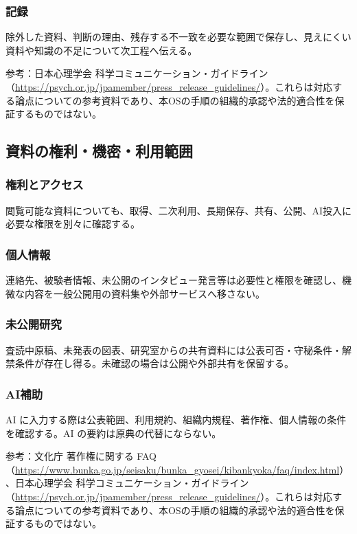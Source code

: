 \documentclass[a4paper,11pt]{article}
\begin{document}
\subsubsection{記録}
\par 除外した資料、判断の理由、残存する不一致を必要な範囲で保存し、見えにくい資料や知識の不足について次工程へ伝える。\par\medskip
\par 参考：日本心理学会 科学コミュニケーション・ガイドライン（\url{https://psych.or.jp/jpamember/press_release_guidelines/}）。これらは対応する論点についての参考資料であり、本OSの手順の組織的承認や法的適合性を保証するものではない。\par\medskip
\subsection{資料の権利・機密・利用範囲}
\subsubsection{権利とアクセス}
\par 閲覧可能な資料についても、取得、二次利用、長期保存、共有、公開、AI投入に必要な権限を別々に確認する。\par\medskip
\subsubsection{個人情報}
\par 連絡先、被験者情報、未公開のインタビュー発言等は必要性と権限を確認し、機微な内容を一般公開用の資料集や外部サービスへ移さない。\par\medskip
\subsubsection{未公開研究}
\par 査読中原稿、未発表の図表、研究室からの共有資料には公表可否・守秘条件・解禁条件が存在し得る。未確認の場合は公開や外部共有を保留する。\par\medskip
\subsubsection{AI補助}
\par AI に入力する際は公表範囲、利用規約、組織内規程、著作権、個人情報の条件を確認する。AI の要約は原典の代替にならない。\par\medskip
\par 参考：文化庁 著作権に関する FAQ（\url{https://www.bunka.go.jp/seisaku/bunka_gyosei/kibankyoka/faq/index.html}）、日本心理学会 科学コミュニケーション・ガイドライン（\url{https://psych.or.jp/jpamember/press_release_guidelines/}）。これらは対応する論点についての参考資料であり、本OSの手順の組織的承認や法的適合性を保証するものではない。\par\medskip
\end{document}
